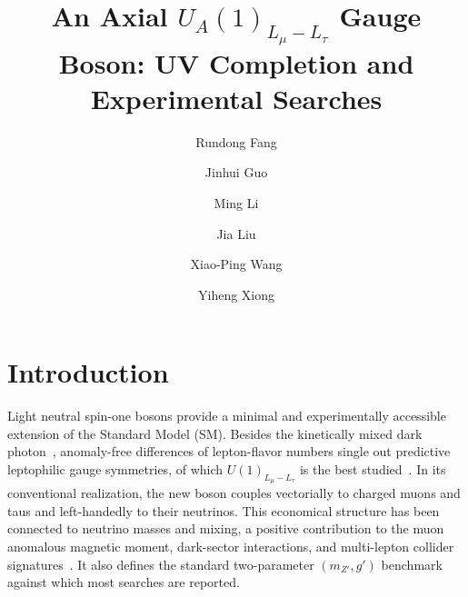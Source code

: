 \documentclass[onecolumn, aps, nofootinbib, prd, preprint, floats, floatfix, amsmath, amssymb, superscriptaddress, preprintnumbers]{revtex4-2}
\begin{document}
\title{An Axial $U_A(1)_{L_\mu-L_\tau}$ Gauge Boson: UV Completion and Experimental Searches}

\author{Rundong Fang}

\author{Jinhui Guo}

\author{Ming Li }

\author{Jia Liu }

\author{Xiao-Ping Wang  }

\author{Yiheng Xiong  }

\maketitle
\tableofcontents

\section{Introduction}
\label{sec:introduction}

Light neutral spin-one bosons provide a minimal and experimentally accessible extension of the Standard Model (SM). Besides the kinetically mixed dark photon~\cite{Holdom:1985ag}, anomaly-free differences of lepton-flavor numbers single out predictive leptophilic gauge symmetries, of which $U(1)_{L_\mu-L_\tau}$ is the best studied~\cite{Foot:1990mn,He:1990pn,He:1991qd}. In its conventional realization, the new boson couples vectorially to charged muons and taus and left-handedly to their neutrinos. This economical structure has been connected to neutrino masses and mixing, a positive contribution to the muon anomalous magnetic moment, dark-sector interactions, and multi-lepton collider signatures~\cite{Baek:2001kca,Ma:2001md,Heeck:2011wj,Harigaya:2013twa,Altmannshofer:2014cfa,Crivellin:2015mga,Altmannshofer:2016brv}. It also defines the standard two-parameter $(m_{Z'},g')$ benchmark against which most searches are reported.
\end{document}

